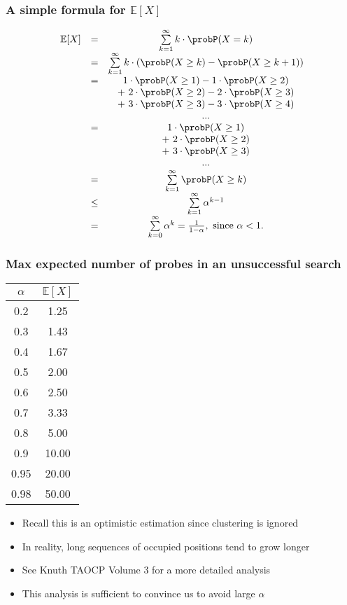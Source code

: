 \documentclass[trans]{beamer}
\begin{document}
\begin{frame}[fragile=singleslide]
\frametitle{A simple formula for $\mathbb{E}[X]$}

{\small
\[
\begin{array}{ccc}
\mathbb{E}[X] &=&\sum\limits_{k=1}^{\infty} k\cdot\probP(X = k)			\\
 &=&\sum\limits_{k=1}^{\infty} k\cdot(\probP(X \ge k)-\probP(X \ge k+1))	\\
 &=&1\cdot \probP(X \ge 1)-1\cdot \probP(X \ge 2)\\
 &&+~2\cdot \probP(X \ge 2)-2\cdot \probP(X \ge 3)\\
 &&+~3\cdot \probP(X \ge 3)-3\cdot \probP(X \ge 4)\\
 && ...\\
 &=&1\cdot \probP(X \ge 1)\\
 &&+~2\cdot \probP(X \ge 2)\\
 &&+~3\cdot \probP(X \ge 3)\\
 && ...\\
 &=&\sum\limits_{k=1}^{\infty} \probP(X \ge k)					\\
 &\le&\sum\limits_{k=1}^{\infty} \alpha^{k-1}					\\
 &=&\sum\limits_{k=0}^{\infty} \alpha^{k}= \frac{1}{1-\alpha},~\mathrm{since}~\alpha < 1.
\end{array}
\]
}

\end{frame}
\begin{frame}[fragile=singleslide]
\frametitle{Max expected number of probes in an unsuccessful search}

\begin{table}[H]
\begin{center}
\begin{tabular}{|c|c|}
\hline
$\alpha$ & $\mathbb{E}[X]$\\
\hline
0.2 & 1.25\\
0.3 & 1.43\\
0.4 & 1.67\\
0.5 & 2.00\\
0.6 & 2.50\\
0.7 & 3.33\\
0.8 & 5.00\\
0.9 & 10.00\\
0.95 & 20.00\\
0.98 & 50.00\\
\hline
\end{tabular}
\end{center}
\end{table}
\begin{itemize}
\item Recall this is an optimistic estimation since clustering is ignored
\item In reality, long sequences of occupied positions tend to grow longer
\item See Knuth TAOCP Volume 3 for a more detailed analysis
\item This analysis is sufficient to convince us to avoid large $\alpha$
\end{itemize}
\end{frame}
\end{document}
